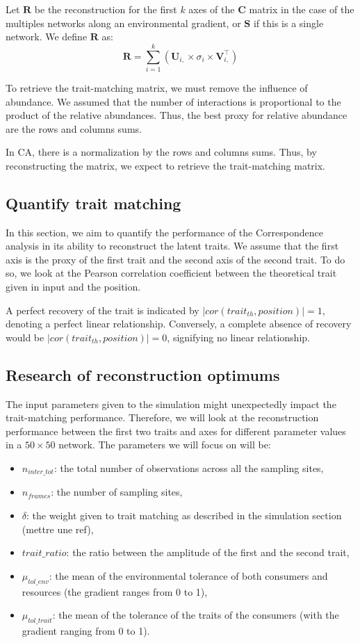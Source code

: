 Let $\mathbf{R}$ be the reconstruction for the first $k$ axes of the $\mathbf{C}$ matrix in the case of the multiples networks along an environmental gradient, or $\mathbf{S}$ if this is a single network. We define $\mathbf{R}$ as:
$$
    \mathbf{R} = \sum_{i=1} ^{k}\left( \mathbf{U}_{i,} \times \sigma_i \times \mathbf{V}_{i,}^\intercal \right)
$$

To retrieve the trait-matching matrix, we must remove the influence of abundance. We assumed that the number of interactions is proportional to the product of the relative abundances.  Thus, the best proxy for relative abundance are the rows and columns sums.

In CA, there is a normalization by the rows and columns sums. Thus, by reconstructing the matrix, we expect to retrieve the trait-matching matrix.

\subsection{Quantify trait matching}

In this section, we aim to quantify the performance of the Correspondence analysis in its ability to reconstruct the latent traits. We assume that the first axis is the proxy of the first trait and the second axis of the second trait. To do so, we look at the Pearson correlation coefficient between the theoretical trait given in input and the position. 

A perfect recovery of the trait is indicated by $\lvert cor(trait_{th}, position)\rvert = 1$, denoting a perfect linear relationship. Conversely, a complete absence of recovery would be $\lvert cor(trait_{th}, position)\rvert = 0$, signifying no linear relationship. 


\subsection{Research of reconstruction optimums}

The input parameters given to the simulation might unexpectedly impact the trait-matching performance. Therefore, we will look at the reconstruction performance between the first two traits and axes for different parameter values in a $50\times50$ network. The parameters we will focus on will be:
\begin{itemize}
    \item $n_{inter\_tot}$: the total number of observations across all the sampling sites,
    \item $n_{frames}$: the number of sampling sites,
    \item $\delta$: the weight given to trait matching as described in the simulation section (mettre une ref),
    \item $trait\_ratio$: the ratio between the amplitude of the first and the second trait,
    \item $\mu_{tol\_env}$: the mean of the environmental tolerance of both consumers and resources (the gradient ranges from 0 to 1),
    \item $\mu_{tol\_trait}$: the mean of the tolerance of the traits of the consumers (with the gradient ranging from 0 to 1).
\end{itemize}


